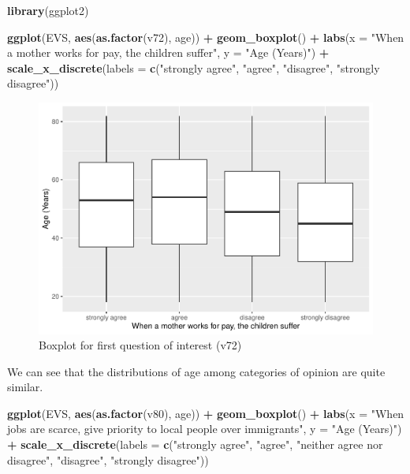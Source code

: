 \documentclass[
]{article}
\newenvironment{Shaded}{\begin{snugshade}}{\end{snugshade}}
\newcommand{\AttributeTok}[1]{\textcolor[rgb]{0.13,0.29,0.53}{#1}}
\newcommand{\FunctionTok}[1]{\textcolor[rgb]{0.13,0.29,0.53}{\textbf{#1}}}
\newcommand{\NormalTok}[1]{#1}
\newcommand{\SpecialCharTok}[1]{\textcolor[rgb]{0.81,0.36,0.00}{\textbf{#1}}}
\newcommand{\StringTok}[1]{\textcolor[rgb]{0.31,0.60,0.02}{#1}}
\begin{document}
\begin{Shaded}
\begin{Highlighting}[]
\FunctionTok{library}\NormalTok{(ggplot2)}

\FunctionTok{ggplot}\NormalTok{(EVS, }\FunctionTok{aes}\NormalTok{(}\FunctionTok{as.factor}\NormalTok{(v72), age)) }\SpecialCharTok{+} 
  \FunctionTok{geom\_boxplot}\NormalTok{() }\SpecialCharTok{+} 
  \FunctionTok{labs}\NormalTok{(}\AttributeTok{x =} \StringTok{"When a mother works for pay, the children suffer"}\NormalTok{, }\AttributeTok{y =} \StringTok{"Age (Years)"}\NormalTok{) }\SpecialCharTok{+} 
  \FunctionTok{scale\_x\_discrete}\NormalTok{(}\AttributeTok{labels =} \FunctionTok{c}\NormalTok{(}\StringTok{"strongly agree"}\NormalTok{, }\StringTok{"agree"}\NormalTok{, }\StringTok{"disagree"}\NormalTok{, }\StringTok{"strongly disagree"}\NormalTok{))}
\end{Highlighting}
\end{Shaded}

\begin{figure}

{\centering \includegraphics[width=0.6\linewidth]{Report-for-statisticians_files/figure-latex/plot_v72-1} 

}

\caption{Boxplot for first question of interest (v72)}\label{fig:plot_v72}
\end{figure}

We can see that the distributions of age among categories of opinion are
quite similar.\\

\begin{Shaded}
\begin{Highlighting}[]
\FunctionTok{ggplot}\NormalTok{(EVS, }\FunctionTok{aes}\NormalTok{(}\FunctionTok{as.factor}\NormalTok{(v80), age)) }\SpecialCharTok{+} 
  \FunctionTok{geom\_boxplot}\NormalTok{() }\SpecialCharTok{+} 
  \FunctionTok{labs}\NormalTok{(}\AttributeTok{x =} \StringTok{"When jobs are scarce, give priority to local people over immigrants"}\NormalTok{, }
       \AttributeTok{y =} \StringTok{"Age (Years)"}\NormalTok{) }\SpecialCharTok{+} 
  \FunctionTok{scale\_x\_discrete}\NormalTok{(}\AttributeTok{labels =} \FunctionTok{c}\NormalTok{(}\StringTok{"strongly agree"}\NormalTok{, }\StringTok{"agree"}\NormalTok{, }\StringTok{"neither agree nor disagree"}\NormalTok{, }
                              \StringTok{"disagree"}\NormalTok{, }\StringTok{"strongly disagree"}\NormalTok{))}
\end{Highlighting}
\end{Shaded}
\end{document}

